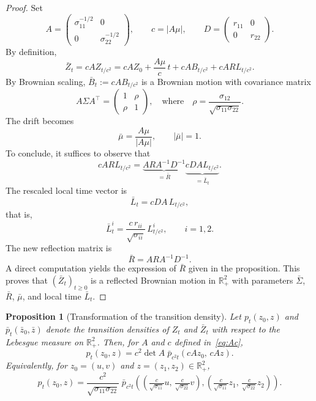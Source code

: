 \documentclass[11pt]{article}
\newtheorem{prop}[thm]{Proposition}
\theoremstyle{definition}
\begin{document}
\begin{proof}
Set
\[
A=\begin{pmatrix}
\sigma_{11}^{-1/2} & 0\\
0 & \sigma_{22}^{-1/2}
\end{pmatrix},
\qquad
c=|A\mu|,
\qquad
D=\begin{pmatrix}
r_{11} & 0\\
0 & r_{22}
\end{pmatrix}.
\]
By definition,
\[
\bar Z_t
=cA Z_{t/c^2}=
cAZ_0+\frac{A\mu}{c}\,t+cA B_{t/c^2}+cA R L_{t/c^2}.
\]
By Brownian scaling, \(\bar B_t := cA B_{t/c^2}\) is a Brownian motion with covariance matrix
\[
A\Sigma A^\top
=
\begin{pmatrix}
1 & \rho\\
\rho & 1
\end{pmatrix},
\quad\text{where}\quad
\rho=\frac{\sigma_{12}}{\sqrt{\sigma_{11}\sigma_{22}}}.
\]
The drift becomes
\[
\bar\mu=\frac{A\mu}{|A\mu|}, \qquad |\bar\mu|=1.
\]
To conclude, it suffices to observe that
\[
cA R L_{t/c^2}
=
\underbrace{A R A^{-1}D^{-1}}_{=\bar R}
\underbrace{c D A L_{t/c^2}}_{=\bar L_t}.
\]
The rescaled local time vector is
\[
\bar L_t
=
cD A\, L_{t/c^2},
\]
that is,
\[
\bar L_t^i=\frac{c\, r_{ii}}{\sqrt{\sigma_{ii}}}\,L_{t/c^2}^i,
\qquad i=1,2.
\]
The new reflection matrix is
\[
\bar R=AR A^{-1}D^{-1}.
\]
A direct computation yields the expression of $\bar R$ given in the proposition.
This proves that \((\bar Z_t)_{t\ge0}\) is a reflected Brownian motion in \(\mathbb{R}_+^2\) with parameters \(\bar\Sigma\), \(\bar R\), \(\bar\mu\), and local time \(\bar L_t\).
\end{proof}





\begin{prop}[Transformation of the transition density]
Let $p_t(z_0,z)$ and $\bar p_t(\bar z_0,\bar z)$ denote the transition densities of $Z_t$ and $\bar Z_t$ with respect to the Lebesgue measure on $\mathbb{R}_+^2$. Then, for $A$ and $c$ defined in~\eqref{eq:Ac},
\[
p_t(z_0,z)
=
c^2 \det A\;
\bar p_{c^2 t}\!\left(cA z_0,\,cA z\right).
\]
Equivalently, for $z_0=(u,v)$ and $z=(z_1,z_2)\in\mathbb{R}_+^2$,
\[
p_t(z_0,z)
=
\frac{c^2}{\sqrt{\sigma_{11}\sigma_{22}}}\;
\bar p_{c^2 t}\!\left(
\left(\tfrac{c}{\sqrt{\sigma_{11}}} u,\, \tfrac{c}{\sqrt{\sigma_{22}}} v\right),
\left(\tfrac{c}{\sqrt{\sigma_{11}}} z_1,\, \tfrac{c}{\sqrt{\sigma_{22}}} z_2\right)
\right).
\]
\end{prop}
\end{document}

